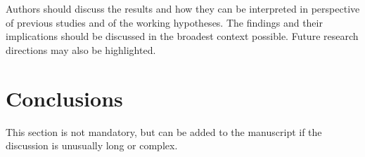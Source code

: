 \documentclass[bioengineering,article,submit,moreauthors,pdftex,10pt,a4paper]{mdpi}
\begin{document}
Authors should discuss the results and how they can be interpreted in perspective of previous studies and of the working hypotheses. The findings and their implications should be discussed in the broadest context possible. Future research directions may also be highlighted.


\section{Conclusions}

This section is not mandatory, but can be added to the manuscript if the discussion is unusually long or complex.

\vspace{6pt} 





\end{document}
